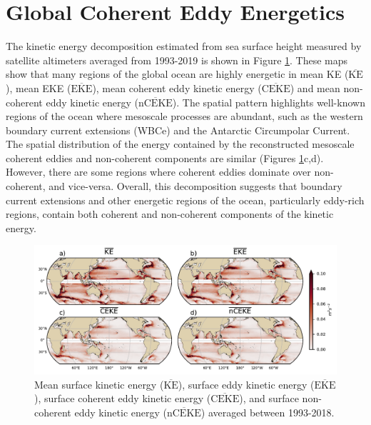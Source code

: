 \documentclass[draft,linenumbers]{agujournal2019}
\newcommand{\MKE}{\overline{\textrm{KE}}}
\newcommand{\MEKE}{\overline{\textrm{EKE}}}
\newcommand{\MCEKE}{\overline{\textrm{CEKE}}}
\newcommand{\MnCEKE}{\overline{\textrm{nCEKE}}}
\begin{document}
	\section{Global Coherent Eddy Energetics}
	\label{sec:CEKE_climatology}


	The kinetic energy decomposition estimated from sea surface height measured by satellite altimeters averaged from 1993-2019 is shown in Figure \ref{fig:eddy_climatology}. 
	These maps show that many regions of the global ocean are highly energetic in mean KE ($\MKE$), mean EKE ($\MEKE$), mean coherent eddy kinetic energy ($\MCEKE$) and mean non-coherent eddy kinetic energy ($\MnCEKE$). 
	The spatial pattern highlights well-known regions of the ocean where mesoscale processes are abundant, such as the western boundary current extensions (WBCe) and the Antarctic Circumpolar Current. 
	The spatial distribution of the energy contained by the reconstructed mesoscale coherent eddies and non-coherent components are similar (Figures \ref{fig:eddy_climatology}c,d). 
	However, there are some regions where coherent eddies dominate over non-coherent, and vice-versa. 
	Overall, this decomposition suggests that boundary current extensions and other energetic regions of the ocean, particularly eddy-rich regions, contain both coherent and non-coherent components of the kinetic energy.

	\begin{figure}[t]
	    \centering
	    \includegraphics[width=1\textwidth]{figures/mean_ke_maps_satellite.pdf}
	    \caption{Mean surface kinetic energy ($\MKE$), surface eddy kinetic energy ($\MEKE$), surface coherent eddy kinetic energy ($\MCEKE$), and surface non-coherent eddy kinetic energy ($\MnCEKE$) averaged between 1993-2018.}
	    \label{fig:eddy_climatology}
	\end{figure}
\end{document}
